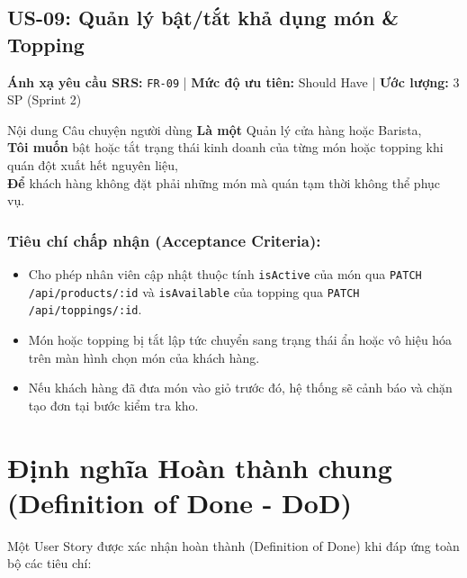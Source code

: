 \documentclass[12pt,a4paper]{article}
\begin{document}
\newpage

\subsection{US-09: Quản lý bật/tắt khả dụng món \& Topping}
\textbf{Ánh xạ yêu cầu SRS:} \texttt{FR-09} \quad | \quad \textbf{Mức độ ưu tiên:} Should Have \quad | \quad \textbf{Ước lượng:} 3 SP (Sprint 2)

\begin{storybox}{Nội dung Câu chuyện người dùng}
\textbf{Là một} Quản lý cửa hàng hoặc Barista,\\
\textbf{Tôi muốn} bật hoặc tắt trạng thái kinh doanh của từng món hoặc topping khi quán đột xuất hết nguyên liệu,\\
\textbf{Để} khách hàng không đặt phải những món mà quán tạm thời không thể phục vụ.
\end{storybox}

\subsubsection*{Tiêu chí chấp nhận (Acceptance Criteria):}
\begin{itemize}[noitemsep]
    \item[\textbf{AC-09.1}] Cho phép nhân viên cập nhật thuộc tính \texttt{isActive} của món qua \texttt{PATCH /api/products/:id} và \texttt{isAvailable} của topping qua \texttt{PATCH /api/toppings/:id}.
    \item[\textbf{AC-09.2}] Món hoặc topping bị tắt lập tức chuyển sang trạng thái ẩn hoặc vô hiệu hóa trên màn hình chọn món của khách hàng.
    \item[\textbf{AC-09.3}] Nếu khách hàng đã đưa món vào giỏ trước đó, hệ thống sẽ cảnh báo và chặn tạo đơn tại bước kiểm tra kho.
\end{itemize}

\section{Định nghĩa Hoàn thành chung (Definition of Done - DoD)}

Một User Story được xác nhận hoàn thành (Definition of Done) khi đáp ứng toàn bộ các tiêu chí:
\end{document}
